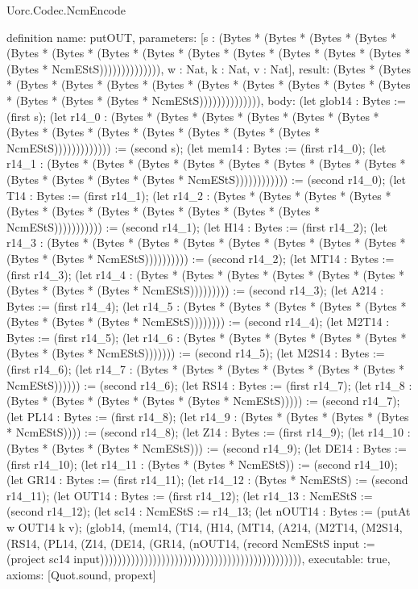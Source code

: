 \begin{lexlean}{Uorc.Codec.NcmEncode}
\begin{semanticmodule}
definition{
  name: putOUT,
  parameters: [s : (Bytes * (Bytes * (Bytes * (Bytes * (Bytes * (Bytes * (Bytes * (Bytes * (Bytes * (Bytes * (Bytes * (Bytes * (Bytes * (Bytes * NcmEStS)))))))))))))), w : Nat, k : Nat, v : Nat],
  result: (Bytes * (Bytes * (Bytes * (Bytes * (Bytes * (Bytes * (Bytes * (Bytes * (Bytes * (Bytes * (Bytes * (Bytes * (Bytes * (Bytes * NcmEStS)))))))))))))),
  body: (let glob14 : Bytes := (first s); (let r14_0 : (Bytes * (Bytes * (Bytes * (Bytes * (Bytes * (Bytes * (Bytes * (Bytes * (Bytes * (Bytes * (Bytes * (Bytes * (Bytes * NcmEStS))))))))))))) := (second s); (let mem14 : Bytes := (first r14_0); (let r14_1 : (Bytes * (Bytes * (Bytes * (Bytes * (Bytes * (Bytes * (Bytes * (Bytes * (Bytes * (Bytes * (Bytes * (Bytes * NcmEStS)))))))))))) := (second r14_0); (let T14 : Bytes := (first r14_1); (let r14_2 : (Bytes * (Bytes * (Bytes * (Bytes * (Bytes * (Bytes * (Bytes * (Bytes * (Bytes * (Bytes * (Bytes * NcmEStS))))))))))) := (second r14_1); (let H14 : Bytes := (first r14_2); (let r14_3 : (Bytes * (Bytes * (Bytes * (Bytes * (Bytes * (Bytes * (Bytes * (Bytes * (Bytes * (Bytes * NcmEStS)))))))))) := (second r14_2); (let MT14 : Bytes := (first r14_3); (let r14_4 : (Bytes * (Bytes * (Bytes * (Bytes * (Bytes * (Bytes * (Bytes * (Bytes * (Bytes * NcmEStS))))))))) := (second r14_3); (let A214 : Bytes := (first r14_4); (let r14_5 : (Bytes * (Bytes * (Bytes * (Bytes * (Bytes * (Bytes * (Bytes * (Bytes * NcmEStS)))))))) := (second r14_4); (let M2T14 : Bytes := (first r14_5); (let r14_6 : (Bytes * (Bytes * (Bytes * (Bytes * (Bytes * (Bytes * (Bytes * NcmEStS))))))) := (second r14_5); (let M2S14 : Bytes := (first r14_6); (let r14_7 : (Bytes * (Bytes * (Bytes * (Bytes * (Bytes * (Bytes * NcmEStS)))))) := (second r14_6); (let RS14 : Bytes := (first r14_7); (let r14_8 : (Bytes * (Bytes * (Bytes * (Bytes * (Bytes * NcmEStS))))) := (second r14_7); (let PL14 : Bytes := (first r14_8); (let r14_9 : (Bytes * (Bytes * (Bytes * (Bytes * NcmEStS)))) := (second r14_8); (let Z14 : Bytes := (first r14_9); (let r14_10 : (Bytes * (Bytes * (Bytes * NcmEStS))) := (second r14_9); (let DE14 : Bytes := (first r14_10); (let r14_11 : (Bytes * (Bytes * NcmEStS)) := (second r14_10); (let GR14 : Bytes := (first r14_11); (let r14_12 : (Bytes * NcmEStS) := (second r14_11); (let OUT14 : Bytes := (first r14_12); (let r14_13 : NcmEStS := (second r14_12); (let sc14 : NcmEStS := r14_13; (let nOUT14 : Bytes := (putAt w OUT14 k v); (glob14, (mem14, (T14, (H14, (MT14, (A214, (M2T14, (M2S14, (RS14, (PL14, (Z14, (DE14, (GR14, (nOUT14, (record NcmEStS {input := (project sc14 input)}))))))))))))))))))))))))))))))))))))))))))))),
  executable: true,
  axioms: [Quot.sound, propext]
}


\end{semanticmodule}
\end{lexlean}
